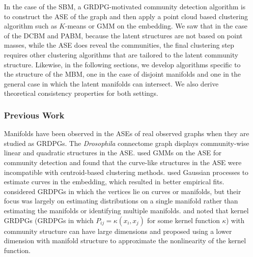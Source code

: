 \documentclass[
  12pt,
]{article}
\theoremstyle{definition}
\theoremstyle{definition}
\theoremstyle{definition}
\theoremstyle{definition}
\theoremstyle{remark}
\begin{document}
In the case of the SBM, a GRDPG-motivated community detection algorithm is to construct the ASE of the graph and then apply a point cloud based clustering algorithm such as \(K\)-means or GMM on the embedding.
We saw that in the case of the DCBM and PABM, because the latent structures are not based on point masses, while the ASE does reveal the communities, the final clustering step requires other clustering algorithms that are tailored to the latent community structure.
Likewise, in the following sections, we develop algorithms specific to the structure of the MBM, one in the case of disjoint manifolds and one in the general case in which the latent manifolds can intersect.
We also derive theoretical consistency properties for both settings.

\hypertarget{previous-work-1}{%
\subsubsection{Previous Work}\label{previous-work-1}}

Manifolds have been observed in the ASEs of real observed graphs when they are studied as GRDPGs.
The \emph{Drosophila} connectome graph \citep{Eichler141762} displays community-wise linear and quadratic structures in the ASE.
\citet{https://doi.org/10.48550/arxiv.1705.03297} used GMMs on the ASE for community detection and found that the curve-like structures in the ASE were incompatible with centroid-based clustering methods.
\citet{SannaPassino2022} used Gaussian processes to estimate curves in the embedding, which resulted in better empirical fits.
\citet{athreya2020estimation} considered GRDPGs in which the vertices lie on curves or manifolds, but their focus was largely on estimating distributions on a single manifold rather than estimating the manifolds or identifying multiple manifolds.
\citet{https://doi.org/10.48550/arxiv.2006.05168} and \citet{https://doi.org/10.48550/arxiv.2208.11665} noted that kernel GRDPGs (GRDPGs in which \(P_{ij} = \kappa(x_i, x_j)\) for some kernel function \(\kappa\)) with community structure can have large dimensions and proposed using a lower dimension with manifold structure to approximate the nonlinearity of the kernel function.
\end{document}
